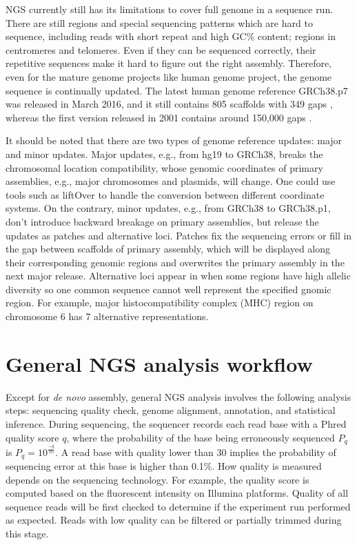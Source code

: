 
NGS currently still has its limitations to cover full genome in a sequence run.
There are still regions and special sequencing patterns which are hard to
sequence, including reads with short repeat and high GC\% content; regions in
centromeres and telomeres. Even if they can be sequenced correctly, their
repetitive sequences make it hard to figure out the right assembly. Therefore,
even for the mature genome projects like human genome project, the genome
sequence is continually updated. The latest human genome reference GRCh38.p7
was released in March 2016, and it still contains 805 scaffolds with 349 gaps
\cite{:grch38p7}, whereas the first version released in 2001 contains around
150,000 gaps \cite{2010:e-pluribus-unum}.


It should be noted that there are two types of genome reference updates: major
and minor updates. Major updates, e.g., from hg19 to GRCh38, breaks the
chromosomal location compatibility, whose genomic coordinates of primary
assemblies, e.g., major chromosomes and plasmids, will change. One could use
tools such as liftOver to handle the conversion between different coordinate
systems. On the contrary, minor updates, e.g., from GRCh38 to GRCh38.p1, don't
introduce backward breakage on primary assemblies, but release the updates as
patches and alternative loci. Patches fix the sequencing errors or fill in the
gap between scaffolds of primary assembly, which will be displayed along their
corresponding genomic regions and overwrites the primary assembly in the next
major release. Alternative loci appear in when some regions have high allelic
diversity so one common sequence cannot well represent the specified gnomic
region. For example, major histocompatibility complex (MHC) region on
chromosome 6 has 7 alternative representations.


%
%

\section{General NGS analysis workflow}

Except for \textit{de novo} assembly, general NGS analysis involves the
following analysis steps: sequencing quality check, genome alignment,
annotation, and statistical inference. During sequencing, the sequencer records
each read base with a Phred quality score $q$, where the probability of the
base being erroneously sequenced $P_q$ is $P_q = 10^{\frac{-q}{10}}$. A read
base with quality lower than 30 implies the probability of sequencing error at
this base is higher than 0.1\%. How quality is measured depends on the
sequencing technology. For example, the quality score is computed based on the
fluorescent intensity on Illumina platforms. Quality of all sequence reads will
be first checked to determine if the experiment run performed as expected.
Reads with low quality can be filtered or partially trimmed during this stage.

